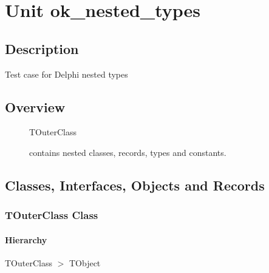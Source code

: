 \documentclass{report}
\newif\ifpdf
\begin{document}
\label{toc}\tableofcontents
\newpage
\newlength{\tmplength}
\chapter{Unit ok{\_}nested{\_}types}
\label{ok_nested_types}
\section{Description}
Test case for Delphi nested types\hfill\vspace*{1ex}

 


\section{Overview}
\begin{description}
\item[\texttt{\begin{ttfamily}TOuterClass\end{ttfamily} Class}]\begin{ttfamily}TOuterClass\end{ttfamily} contains nested classes, records, types and constants.
\end{description}
\section{Classes, Interfaces, Objects and Records}
\ifpdf
\subsection*{\large{\textbf{TOuterClass Class}}\normalsize\hspace{1ex}\hrulefill}
\else
\subsection*{TOuterClass Class}
\fi
\label{ok_nested_types.TOuterClass}
\subsubsection*{\large{\textbf{Hierarchy}}\normalsize\hspace{1ex}\hfill}
TOuterClass {$>$} TObject
\end{document}
